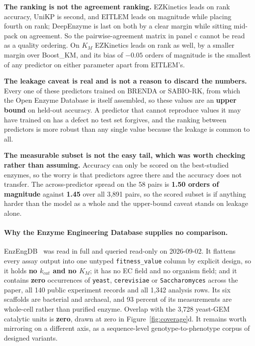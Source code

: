 \textbf{The ranking is not the agreement ranking.} EZKinetics leads on rank accuracy, UniKP
is second, and EITLEM leads on magnitude while placing fourth on rank; DeepEnzyme is last on
both by a clear margin while sitting mid-pack on agreement. So the pairwise-agreement matrix
in panel c cannot be read as a quality ordering. On $K_M$
EZKinetics leads on rank as well, by a smaller margin over Boost\_KM, and its bias of
$-0.05$ orders of magnitude is the smallest of any predictor on either parameter apart from EITLEM's.

\textbf{The leakage caveat is real and is not a reason to discard the numbers.} Every one of
these predictors trained on BRENDA or SABIO-RK, from which the Open Enzyme Database is
itself assembled, so these values are an \textbf{upper bound} on held-out accuracy. A
predictor that cannot reproduce values it may have trained on has a defect no test set
forgives, and the ranking between predictors is more robust than any single value because
the leakage is common to all.

\textbf{The measurable subset is not the easy tail, which was worth checking rather than
assuming.} Accuracy can only be scored on the best-studied enzymes, so the worry is that
predictors agree there and the accuracy does not transfer. The across-predictor spread on
the 58 pairs is \textbf{1.50 orders of magnitude} against \textbf{1.45} over all 3{,}891
pairs, so the scored subset is if anything harder than the model as a whole and the
upper-bound caveat stands on leakage alone.

\paragraph{Why the Enzyme Engineering Database supplies no comparison.}
EnzEngDB~\cite{longEnzymeEngineeringDatabase2026} was read in full and queried read-only on
2026-09-02. It flattens every assay output into one untyped \texttt{fitness\_value} column
by explicit design, so it holds \textbf{no $k_{cat}$ and no $K_M$}; it has no EC field and no
organism field; and it contains \textbf{zero} occurrences of \texttt{yeast},
\texttt{cerevisiae} or \texttt{Saccharomyces} across the paper, all 140 public experiment
records and all 1{,}342 analysis rows. Its six scaffolds are bacterial and archaeal, and
93 percent of its measurements are whole-cell rather than purified enzyme. Overlap with the
3{,}728 yeast-GEM catalytic units is \textbf{zero}, drawn at zero in
Figure~\ref{fig:coverage}d. It remains worth mirroring on a different axis, as a
sequence-level genotype-to-phenotype corpus of designed variants.


